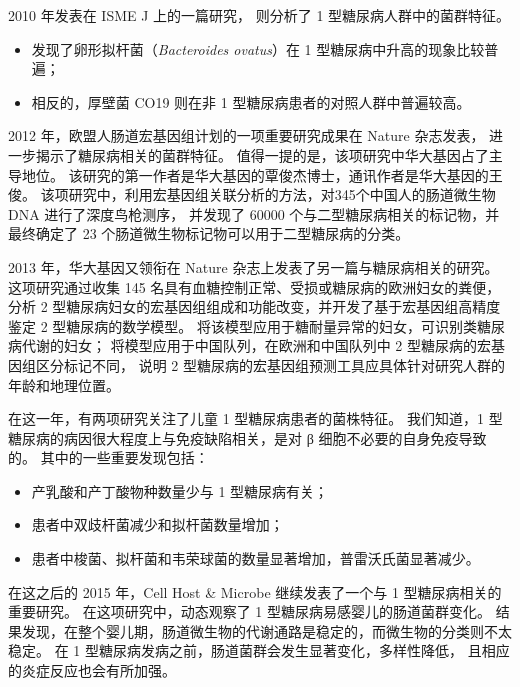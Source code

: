 \documentclass[]{ctexbook}
\providecommand{\tightlist}{%
  \setlength{\itemsep}{0pt}\setlength{\parskip}{0pt}}
\begin{document}
2010 年发表在 ISME J 上的一篇研究，
则分析了 1 型糖尿病人群中的菌群特征\citep{giongoDefiningAutoimmuneMicrobiome2011}。

\begin{itemize}
\tightlist
\item
  发现了卵形拟杆菌（\emph{Bacteroides ovatus}）在 1 型糖尿病中升高的现象比较普遍；
\item
  相反的，厚壁菌 CO19 则在非 1 型糖尿病患者的对照人群中普遍较高。
\end{itemize}

2012 年，欧盟人肠道宏基因组计划的一项重要研究成果在 Nature 杂志发表，
进一步揭示了糖尿病相关的菌群特征\citep{qinMetagenomewideAssociationStudy2012b}。
值得一提的是，该项研究中华大基因占了主导地位。
该研究的第一作者是华大基因的覃俊杰博士，通讯作者是华大基因的王俊。
该项研究中，利用宏基因组关联分析的方法，对345个中国人的肠道微生物 DNA 进行了深度鸟枪测序，
并发现了 60000 个与二型糖尿病相关的标记物，并最终确定了 23 个肠道微生物标记物可以用于二型糖尿病的分类。

2013 年，华大基因又领衔在 Nature 杂志上发表了另一篇与糖尿病相关的研究\citep{karlssonGutMetagenomeEuropean2013}。
这项研究通过收集 145 名具有血糖控制正常、受损或糖尿病的欧洲妇女的粪便，
分析 2 型糖尿病妇女的宏基因组组成和功能改变，并开发了基于宏基因组高精度鉴定 2 型糖尿病的数学模型。
将该模型应用于糖耐量异常的妇女，可识别类糖尿病代谢的妇女；
将模型应用于中国队列，在欧洲和中国队列中 2 型糖尿病的宏基因组区分标记不同，
说明 2 型糖尿病的宏基因组预测工具应具体针对研究人群的年龄和地理位置。

在这一年，有两项研究关注了儿童 1 型糖尿病患者的菌株特征\citep{murriGutMicrobiotaChildren2013, goffauFecalMicrobiotaComposition2013}。
我们知道，1 型糖尿病的病因很大程度上与免疫缺陷相关，是对 β 细胞不必要的自身免疫导致的。
其中的一些重要发现包括：

\begin{itemize}
\tightlist
\item
  产乳酸和产丁酸物种数量少与 1 型糖尿病有关；
\item
  患者中双歧杆菌减少和拟杆菌数量增加；
\item
  患者中梭菌、拟杆菌和韦荣球菌的数量显著增加，普雷沃氏菌显著减少。
\end{itemize}

在这之后的 2015 年，Cell Host \& Microbe 继续发表了一个与 1 型糖尿病相关的重要研究。
在这项研究中，动态观察了 1 型糖尿病易感婴儿的肠道菌群变化\citep{kosticDynamicsHumanInfant2015}。
结果发现，在整个婴儿期，肠道微生物的代谢通路是稳定的，而微生物的分类则不太稳定。
在 1 型糖尿病发病之前，肠道菌群会发生显著变化，多样性降低，
且相应的炎症反应也会有所加强。
\end{document}
